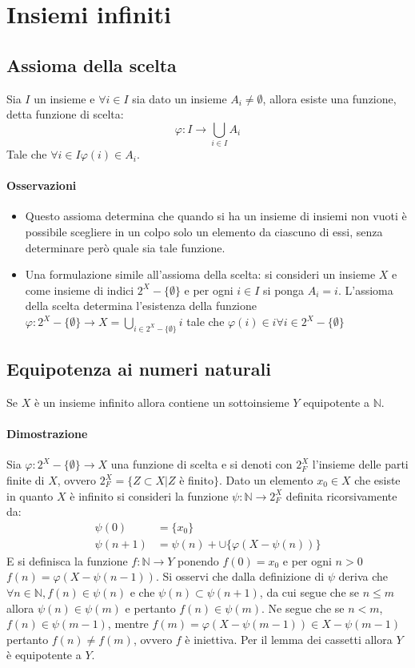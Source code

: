 \chapter{Insiemi infiniti}
\section{Assioma della scelta}
Sia $I$ un insieme e $\forall i\in I$ sia dato un insieme $A_i\neq\emptyset$, allora esiste una funzione, detta funzione di scelta:
\begin{equation}
\varphi: I\rightarrow\bigcup\limits_{i\in I}A_i
\end{equation}
Tale che $\forall i\in I\varphi(i)\in A_i$.
\subsubsection{Osservazioni}
\begin{itemize}
\item Questo assioma determina che quando si ha un insieme di insiemi non vuoti \`e possibile scegliere in un colpo solo un elemento da ciascuno di essi, senza
determinare per\`o quale sia tale funzione. 
\item Una formulazione simile all'assioma della scelta: si consideri un insieme $X$ e come insieme di indici $2^X-\{\emptyset\}$ e per ogni $i\in I$ si ponga 
$A_i=i$. L'assioma della scelta determina l'esistenza della funzione $\varphi:2^X-\{\emptyset\}\rightarrow X=\bigcup\limits_{i\in 2^X-\{\emptyset\}} i$ tale che 
$\varphi(i)\in i\forall i\in 2^X-\{\emptyset\}$
\end{itemize}
\section{Equipotenza ai numeri naturali}
Se $X$ \`e un insieme infinito allora contiene un sottoinsieme $Y$ equipotente a $\mathbb{N}$. 
\subsubsection{Dimostrazione}
Sia $\varphi:2^X-\{\emptyset\}\rightarrow X$ una funzione di scelta e si denoti con $2^X_F$ l'insieme delle parti finite di $X$, ovvero $2^X_F=\{Z\subset X|Z$ 
\`e finito$\}$. Dato un elemento $x_0\in X$ che esiste in quanto $X$ \`e infinito si consideri la funzione $\psi:\mathbb{N}\rightarrow 2^X_F$ definita 
ricorsivamente da:
\begin{align*}
\psi(0)&=\{x_0\}\\
\psi(n+1)&=\psi(n)+\cup\{\varphi(X-\psi(n))\}
\end{align*}
E si definisca la funzione $f:\mathbb{N}\rightarrow Y$ ponendo $f(0)=x_0$ e per ogni $n>0$ $f(n)=\varphi(X-\psi(n-1))$. Si osservi che dalla definizione di $\psi$
deriva che $\forall n\in\mathbb{N}, f(n)\in\psi(n)$ e che $\psi(n)\subset\psi(n+1)$, da cui segue che se $n\le m$ allora $\psi(n)\in\psi(m)$ e pertanto $f(n)\in
\psi(m)$. Ne segue che se $n<m$, $f(n)\in\psi(m-1)$, mentre $f(m)=\varphi(X-\psi(m-1))\in X-\psi(m-1)$ pertanto $f(n)\neq f(m)$, ovvero $f$ \`e iniettiva. Per
il lemma dei cassetti allora $Y$ \`e equipotente a $Y$.
